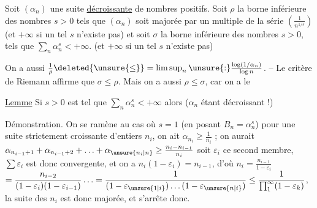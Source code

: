 Soit $(\alpha_n)$ une suite \uline{décroissante}  de nombres
positifs. Soit $\rho$ la borne inférieure des nombres
 $s>0$ tels que $(\alpha_n)$ soit majorée par
un multiple de la série $\left(\frac{1}{n^{1/s}}\right)$ (et $+\infty$
si un tel $s$ n'existe pas) et soit $\sigma$ la
borne inférieure des nombres $s>0$, tels que
$\sum_n\alpha_n^s<+\infty$. (et $+\infty$ si un tel $s$ n'existe pas)

On a aussi $\frac1\rho\deleted{\unsure{\leq}}=\limsup_n\unsure{:}\frac{\log(1/\alpha_n)}{\log n}$.  -- Le critère de Riemann affirme
que \deleted{$\unsure{\rho\leq|\rho\leq\sigma}$} $\sigma\leq\rho$. Mais on a aussi $\rho\leq\sigma$,
car on a le

\uline{Lemme} \quad Si $s>0$ est tel que $\sum_n\alpha_n^s<+\infty$
alors \inserted{$\unsure{\geq}$}   ($\alpha_n$ étant décroissant !)

Démonstration. On se ramène au cas où $s=1$
(en posant $B_n=\alpha_n^s$)   pour une suite
strictement croissante d'entiers $n_i$, on  ait
$\alpha_{n_i}\geq\frac1{n_i}$ ;  on aurait \quad $\alpha_{n_{i-1}+1}+\alpha_{n_{i-1}+2}+\ldots+\alpha_{\unsure{n_i|n}}\geq\frac{n_i-n_{i-1}}{n_i}$
soit $\varepsilon_i$ ce second membre, $\sum\varepsilon_i$ est donc
convergente, et on a $n_i(1-\varepsilon_i)=n_{i-1}$, d'où $n_i=\frac{n_{i-1}}{1-\varepsilon_i}$
$\displaystyle =\frac{n_{i-2}}{(1-\varepsilon_i)(1-\varepsilon_{i-1})}\ldots=\frac1{(1-\varepsilon_{\unsure{1|i}})\ldots(1-\varepsilon_{\unsure{n|i}})}\leq\frac1{\prod_1^\infty(1-\varepsilon_k)}$, la suite
des $n_i$ est donc majorée, et s'arrête donc.
